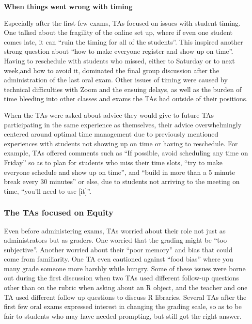 \documentclass[
  letterpaper,
  DIV=11,
  numbers=noendperiod]{scrartcl}
\begin{document}
\textbf{When things went wrong with timing}

Especially after the first few exams, TAs focused on issues with student
timing. One talked about the fragility of the online set up, where if
even one student comes late, it can ``ruin the timing for all of the
students''. This inspired another strong question about ``how to make
everyone register and show up on time''. Having to reschedule with
students who missed, either to Saturday or to next week,and how to avoid
it, dominated the final group discussion after the administration of the
last oral exam. Other issues of timing were caused by technical
difficulties with Zoom and the ensuing delays, as well as the burden of
time bleeding into other classes and exams the TAs had outside of their
positions.

When the TAs were asked about advice they would give to future TAs
participating in the same experience as themselves, their advice
overwhelmingly centered around optimal time management due to previously
mentioned experiences with students not showing up on time or having to
reschedule. For example, TAs offered comments such as ``If possible,
avoid scheduling any time on Friday'' so as to plan for students who
miss their time slots, ``try to make everyone schedule and show up on
time'', and ``build in more than a 5 minute break every 30 minutes'' or
else, due to students not arriving to the meeting on time, ``you'll need
to use {[}it{]}''.

\hypertarget{the-tas-focused-on-equity}{%
\subsubsection{The TAs focused on
Equity}\label{the-tas-focused-on-equity}}

Even before administering exams, TAs worried about their role not just
as administrators but as graders. One worried that the grading might be
``too subjective''. Another worried about their ``poor memory'' and bias
that could come from familiarity. One TA even cautioned against ``food
bias'' where you many grade someone more harshly while hungry. Some of
these issues were borne out during the first discussion when two TAs
used different follow-up questions other than on the rubric when asking
about an R object, and the teacher and one TA used different follow up
questions to discuss R libraries. Several TAs after the first few oral
exams expressed interest in changing the grading scale, so as to be fair
to students who may have needed prompting, but still got the right
answer.
\end{document}
